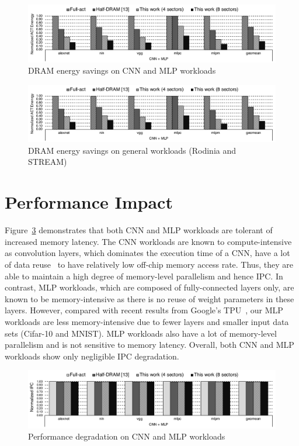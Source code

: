 \begin{figure}[t]
    \centering
        \includegraphics[width=\linewidth, page=3]{figure/thesis-eval.pdf}
    \caption{DRAM energy savings on CNN and MLP workloads}
    \label{fig:ch4:DRAM_e_cnn}
\end{figure}

\begin{figure}[t]
    \centering
        \includegraphics[width=\linewidth, page=4]{figure/thesis-eval.pdf}
    \caption{DRAM energy savings on general workloads (Rodinia and STREAM)}
    \label{fig:ch4:DRAM_e_gen}
\end{figure}

\section{Performance Impact}
Figure~\ref{fig:ch4:perf_cnn} demonstrates that both CNN and MLP workloads are tolerant of increased memory latency. The CNN workloads are known to compute-intensive as convolution layers, which dominates the execution time of a CNN, have a lot of data reuse~ to have relatively low off-chip memory access rate. Thus, they are able to maintain a high degree of memory-level parallelism and hence IPC. In contrast, MLP workloads, which are composed of fully-connected layers only, are known to be memory-intensive as there is no reuse of weight parameters in these layers. However, compared with recent results from Google's TPU~, our MLP workloads are less memory-intensive due to fewer layers and smaller input data sets (Cifar-10 and MNIST). MLP workloads also have a lot of memory-level parallelism and is not sensitive to memory latency. Overall, both CNN and MLP workloads show only negligible IPC degradation.

\begin{figure}[t]
    \centering
        \includegraphics[width=\linewidth]{figure/perf-1.pdf}
    \caption{Performance degradation on CNN and MLP workloads}
    \label{fig:ch4:perf_cnn}
\end{figure}

